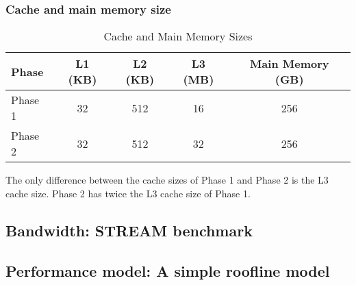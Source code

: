 \documentclass[unicode,11pt,a4paper,oneside,numbers=endperiod,openany]{scrartcl}
\begin{document}
\subsubsection{Cache and main memory size}

\begin{table}[ht]
\centering
\caption{Cache and Main Memory Sizes}
\begin{tabular}{|l|c|c|c|c|}
\hline
\textbf{Phase} & \textbf{L1 (KB)} & \textbf{L2 (KB)} & \textbf{L3 (MB)} & \textbf{Main Memory (GB)} \\ \hline
Phase 1        & 32               & 512              & 16               & 256                      \\ \hline
Phase 2        & 32               & 512              & 32               & 256                      \\ \hline
\end{tabular}
\end{table}

The only difference between the cache sizes of Phase 1 and Phase 2 is the L3 cache size. 
Phase 2 has twice the L3 cache size of Phase 1.

\subsection{Bandwidth: STREAM benchmark}



\subsection{Performance model: A simple roofline model}
\end{document}

